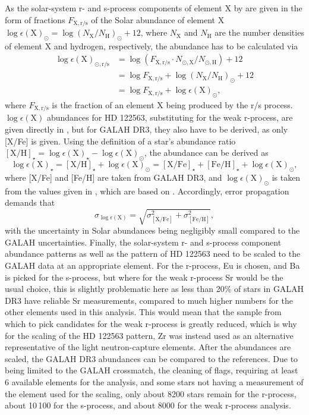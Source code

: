 \documentclass[a4paper,11pt]{article}
\begin{document}
%
As the solar-system r- and s-process components of element X by \citet{prantzos20} are given in the form of fractions $F_\mathrm{X,r/s}$ of the Solar abundance of element X $\log{\epsilon(\mathrm{X})}_\odot=\log{(N_\mathrm{X}/N_\mathrm{H})}_\odot+12$, where $N_\mathrm{X}$ and $N_\mathrm{H}$ are the number densities of element X and hydrogen, respectively, the abundance has to be calculated via
%
\begin{align}
 \log{\epsilon(\mathrm{X})}_{\mathrm{\odot,r/s}}&=\log{(F_\mathrm{X,r/s}\cdot N_\mathrm{\odot,X}/N_\mathrm{\odot,H})}+12\nonumber \\
 &=\log{F_\mathrm{X,r/s}}+\log{(N_\mathrm{X}/N_\mathrm{H})}_\odot+12\nonumber \\
 &=\log{F_\mathrm{X,r/s}}+\log{\epsilon(\mathrm{X})}_\odot,
\end{align}
%
where $F_\mathrm{X,r/s}$ is the fraction of an element X being produced by the r/s process. $\log{\epsilon(\mathrm{X})}$ abundances for HD 122563, substituting for the weak r-process, are given directly in \citet{honda06}, but for GALAH DR3, they also have to be derived, as only [X/Fe] is given. Using the definition of a star's abundance ratio $\mathrm{[X/H]}_\star=\log{\epsilon(\mathrm{X})}_\star-\log{\epsilon(\mathrm{X})}_\odot$, the abundance can be derived as
%
\begin{equation}
 \log{\epsilon(\mathrm{X})}_\star=\mathrm{[X/H]}_\star+\log{\epsilon(\mathrm{X})}_\odot=\mathrm{[X/Fe]}_\star+\mathrm{[Fe/H]}_\star+\log{\epsilon(\mathrm{X})}_\odot,
\end{equation}
%
where [X/Fe] and [Fe/H] are taken from GALAH DR3, and $\log{\epsilon(\mathrm{X})}_\odot$ is taken from the values given in \citet{prantzos20}, which are based on \citet{lodders09}. Accordingly, error propagation demands that
%
\begin{equation}
 \sigma_{\log{\epsilon(\mathrm{X})}}=\sqrt{\sigma_\mathrm{[X/Fe]}^2+\sigma_\mathrm{[Fe/H]}^2},
\end{equation}
%
with the uncertainty in Solar abundances being negligibly small compared to the GALAH uncertainties. Finally, the solar-system r- and s-process component abundance patterns as well as the pattern of HD 122563 need to be scaled to the GALAH data at an appropriate element. For the r-process, Eu is chosen, and Ba is picked for the s-process, but where for the weak r-process Sr would be the usual choice, this is slightly problematic here as less than 20\% of stars in GALAH DR3 have reliable Sr measurements, compared to much higher numbers for the other elements used in this analysis. This would mean that the sample from which to pick candidates for the weak r-process is greatly reduced, which is why for the scaling of the HD 122563 pattern, Zr was instead used as an alternative representative of the light neutron-capture elements. After the abundances are scaled, the GALAH DR3 abundances can be compared to the references. Due to being limited to the GALAH crossmatch, the cleaning of flags, requiring at least 6 available elements for the analysis, and some stars not having a measurement of the element used for the scaling, only about 8200 stars remain for the r-process, about 10\,100 for the s-process, and about 8000 for the weak r-process analysis.\\ \\
\end{document}
